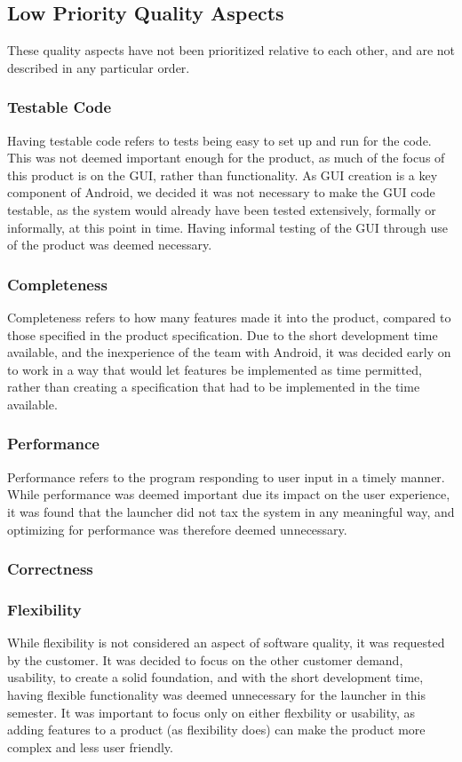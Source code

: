 \subsection{Low Priority Quality Aspects}
These quality aspects have not been prioritized relative to each other, and are not described in any particular order. 

\subsubsection{Testable Code}
Having testable code refers to tests being easy to set up and run for the code. 
This was not deemed important enough for the product, as much of the focus of this product is on the GUI, rather than functionality. 
As GUI creation is a key component of Android, we decided it was not necessary to make the GUI code testable, as the system would already have been tested extensively, formally or informally, at this point in time. 
Having informal testing of the GUI through use of the product was deemed necessary.

\subsubsection{Completeness}
Completeness refers to how many features made it into the product, compared to those specified in the product specification. 
Due to the short development time available, and the inexperience of the team with Android, it was decided early on to work in a way that would let features be implemented as time permitted, rather than creating a specification that had to be implemented in the time available.

\subsubsection{Performance}
Performance refers to the program responding to user input in a timely manner. 
While performance was deemed important due its impact on the user experience, it was found that the launcher did not tax the system in any meaningful way, and optimizing for performance was therefore deemed unnecessary.

\subsubsection{Correctness}

\subsubsection{Flexibility}
While flexibility is not considered an aspect of software quality, it was requested by the customer. 
It was decided to focus on the other customer demand, usability, to create a solid foundation, and with the short development time, having flexible functionality was deemed unnecessary for the launcher in this semester. 
It was important to focus only on either flexbility or usability, as adding features to a product (as flexibility does) can make the product more complex and less user friendly. 